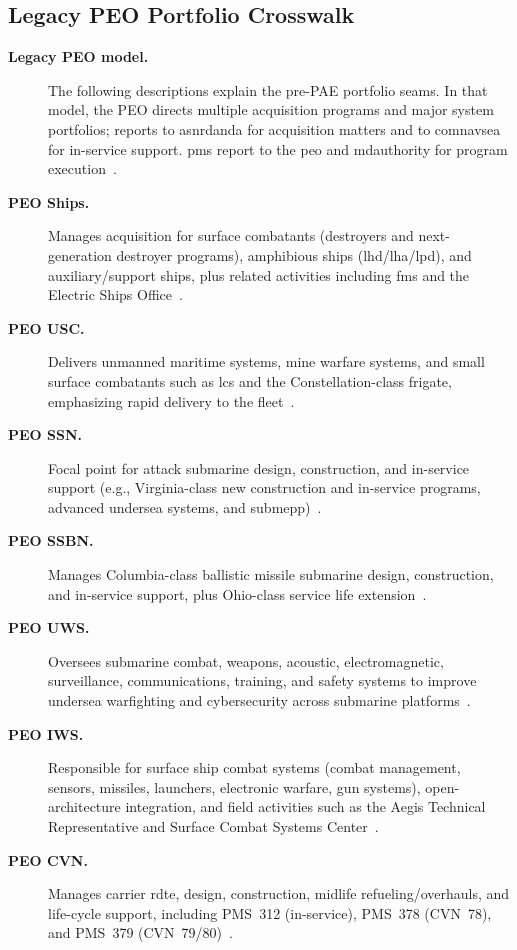\documentclass[../main.tex]{subfiles}
\begin{document}
\subsection{Legacy PEO Portfolio Crosswalk}
\begin{description}
  \item[\textbf{Legacy PEO model.}] The following descriptions explain the pre-PAE portfolio seams. In that model, the PEO directs multiple acquisition programs and major system portfolios; reports to \ac{asnrdanda} for acquisition matters and to \ac{comnavsea} for in-service support. \acp{pm} report to the \ac{peo} and \ac{mdauthority} for program execution~\autocite{edo-2-1-2-navsea-organization-2025}.
  \item[\textbf{PEO Ships.}] Manages acquisition for surface combatants (destroyers and next-generation destroyer programs), amphibious ships (\ac{lhd}/\ac{lha}/\ac{lpd}), and auxiliary/support ships, plus related activities including \ac{fms} and the Electric Ships Office~\autocite{edo-2-1-2-navsea-organization-2025}.
  \item[\textbf{PEO USC.}] Delivers unmanned maritime systems, mine warfare systems, and small surface combatants such as \ac{lcs} and the Constellation-class frigate, emphasizing rapid delivery to the fleet~\autocite{edo-2-1-2-navsea-organization-2025}.
  \item[\textbf{PEO SSN.}] Focal point for attack submarine design, construction, and in-service support (e.g., Virginia-class new construction and in-service programs, advanced undersea systems, and \ac{submepp})~\autocite{edo-2-1-2-navsea-organization-2025}.
  \item[\textbf{PEO SSBN.}] Manages Columbia-class ballistic missile submarine design, construction, and in-service support, plus Ohio-class service life extension~\autocite{edo-2-1-2-navsea-organization-2025}.
  \item[\textbf{PEO UWS.}] Oversees submarine combat, weapons, acoustic, electromagnetic, surveillance, communications, training, and safety systems to improve undersea warfighting and cybersecurity across submarine platforms~\autocite{edo-2-1-2-navsea-organization-2025}.
  \item[\textbf{PEO IWS.}] Responsible for surface ship combat systems (combat management, sensors, missiles, launchers, electronic warfare, gun systems), open-architecture integration, and field activities such as the Aegis Technical Representative and Surface Combat Systems Center~\autocite{edo-2-1-2-navsea-organization-2025}.
  \item[\textbf{PEO CVN.}] Manages carrier \ac{rdte}, design, construction, midlife refueling/overhauls, and life-cycle support, including PMS~312 (in-service), PMS~378 (CVN~78), and PMS~379 (CVN~79/80)~\autocite{edo-2-1-2-navsea-organization-2025}.
\end{description}
\end{document}
